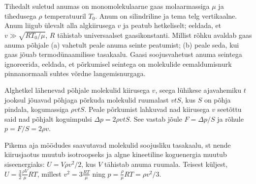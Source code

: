 
Tihedalt suletud anumas on monomolekulaarne gaas molaarmassiga $\mu$ ja tihedusega $\rho$ temperatuuril $T_0$. Anum on silindriline ja tema telg vertikaalne. Anum liigub ülevalt alla algkiirusega $v$ ja peatub hetkeliselt; eeldada, et $v\gg \sqrt{RT_0/\mu}$, $R$ tähistab universaalset gaasikonstanti. Millist rõhku avaldab gaas anuma põhjale (a) vahetult peale anuma seinte peatumist; (b) peale seda, kui gaas jõuab termodünaamilisse tasakaalu. Gaasi soojusvahetust anuma seintega ignoreerida, eeldada, et põrkumisel seintega on molekulide eemaldumisnurk pinnanormaali suhtes võrdne langemisnurgaga.


\hint

\solu
Alghetkel lähenevad põhjale molekulid kiirusega $v$, seega lühikese ajavahemiku $t$ jooksul jõuavad põhjaga põrkuda molekulid ruumalast $vtS$, kus $S$ on põhja pindala, kogumassiga $\rho vtS$. Peale põrkumist lahkuvad nad kiirusega $v$ seetõttu said nad põhjalt koguimpulsi $\Delta p=2\rho vtS$. See vastab jõule $F=\Delta p/S$ ja rõhule $p=F/S=2\rho v$.

Pikema aja möödudes saavutavad molekulid soojusliku tasakaalu, st nende kiirusjaotus muutub isotroopseks ja algne kineetiline koguenergia muutub siseenergiaks: $U=V\rho v^2/2$, kus $V$ tähistab anuma ruumala. Teisest küljest, $U=\frac 32 \frac{\rho V}\mu RT$, millest $v^2=3 \frac{ RT}\mu$ ning $p=\frac{\rho}\mu RT=\rho v^2/3$.
\probend
